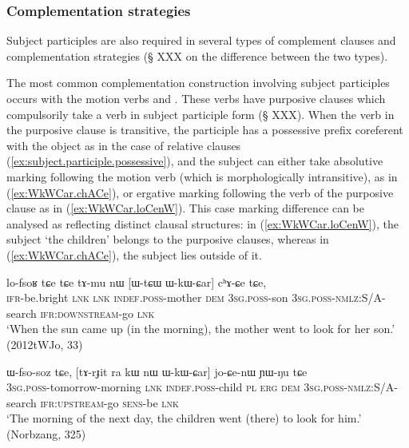 \subsubsection{Complementation strategies}  \label{ex:subject.participle.complementation}
Subject participles are also required in several types of complement clauses and complementation strategies (§ XXX on the difference between the two types).

The most common complementation construction involving subject participles occurs with the motion verbs  and . These verbs have purposive clauses which compulsorily take a verb in subject participle form (§ XXX).  When the verb in the purposive clause is transitive, the participle has a possessive prefix coreferent with the object as in the case of relative clauses (\ref{ex:subject.participle.possessive}), and the subject can either take absolutive marking following the motion verb (which is morphologically intransitive), as in (\ref{ex:WkWCar.chACe}), or ergative  marking following the verb of the purposive clause as in (\ref{ex:WkWCar.loCenW}). This case marking difference can be analysed as reflecting distinct clausal structures: in (\ref{ex:WkWCar.loCenW}), the subject  `the children' belongs to the purposive clauses, whereas in (\ref{ex:WkWCar.chACe}), the subject  lies outside of it.

\begin{exe}
\ex \label{ex:WkWCar.chACe}
 \gll lo-fsoʁ tɕe tɕe tɤ-mu nɯ [ɯ-tɕɯ ɯ-kɯ-ɕar] cʰɤ-ɕe tɕe,\\
 \textsc{ifr}-be.bright \textsc{lnk} \textsc{lnk} \textsc{indef}.\textsc{poss}-mother \textsc{dem} \textsc{3sg}.\textsc{poss}-son \textsc{3sg}.\textsc{poss}-\textsc{nmlz}:S/A-search \textsc{ifr}:\textsc{downstream}-go \textsc{lnk} \\
\glt `When the sun came up (in the morning), the mother went to look for her son.' (2012tWJo, 33)
\end{exe}

\begin{exe}
\ex \label{ex:WkWCar.loCenW}
 \gll ɯ-fso-soz tɕe, [tɤ-rɟit ra kɯ nɯ ɯ-kɯ-ɕar] jo-ɕe-nɯ ɲɯ-ŋu tɕe \\
 \textsc{3sg}.\textsc{poss}-tomorrow-morning \textsc{lnk} \textsc{indef}.\textsc{poss}-child \textsc{pl} \textsc{erg} \textsc{dem} \textsc{3sg}.\textsc{poss}-\textsc{nmlz}:S/A-search \textsc{ifr}:\textsc{upstream}-go \textsc{sens}-be \textsc{lnk} \\
\glt  `The morning of the next day, the children went (there) to look for him.'  (Norbzang, 325)
\end{exe}

